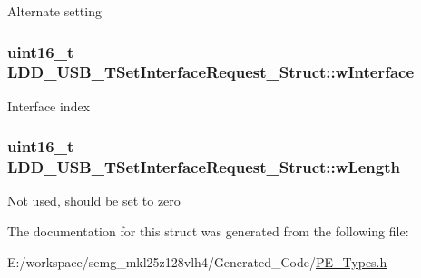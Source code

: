 Alternate setting \hypertarget{struct_l_d_d___u_s_b___t_set_interface_request___struct_a6554d6522c7dcbd0e96cbe945b1725de}{
\subsubsection[{w\-Interface}]{\setlength{\rightskip}{0pt plus 5cm}uint16\-\_\-t L\-D\-D\-\_\-\-U\-S\-B\-\_\-\-T\-Set\-Interface\-Request\-\_\-\-Struct\-::w\-Interface}}\label{struct_l_d_d___u_s_b___t_set_interface_request___struct_a6554d6522c7dcbd0e96cbe945b1725de}
Interface index \hypertarget{struct_l_d_d___u_s_b___t_set_interface_request___struct_a7ccdd1f214e5cebbc10cde359ccba50e}{
\subsubsection[{w\-Length}]{\setlength{\rightskip}{0pt plus 5cm}uint16\-\_\-t L\-D\-D\-\_\-\-U\-S\-B\-\_\-\-T\-Set\-Interface\-Request\-\_\-\-Struct\-::w\-Length}}\label{struct_l_d_d___u_s_b___t_set_interface_request___struct_a7ccdd1f214e5cebbc10cde359ccba50e}
Not used, should be set to zero 

The documentation for this struct was generated from the following file\-:\begin{DoxyCompactItemize}
\item 
E\-:/workspace/semg\-\_\-mkl25z128vlh4/\-Generated\-\_\-\-Code/\hyperlink{_p_e___types_8h}{P\-E\-\_\-\-Types.\-h}\end{DoxyCompactItemize}
